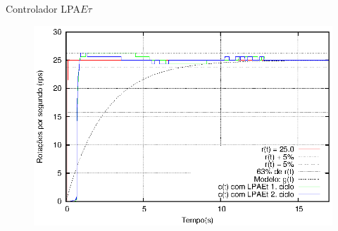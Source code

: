 \begin{frame}{Controlador LPA$E\tau$}

\vspace{-0.5cm}
\begin{figure}[!htb]
\center\includegraphics[scale=1.0]{./plot/LPAEt-erro.eps}
\label{fig:lpaetErro}

\end{figure}


\end{frame}
